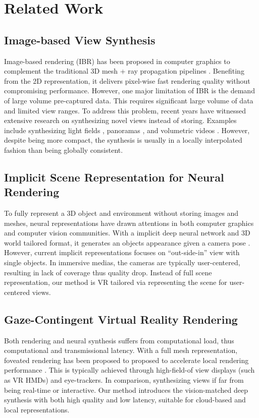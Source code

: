 \section{Related Work}
\label{sec:prior}

\subsection{Image-based View Synthesis}
Image-based rendering (IBR) has been proposed in computer graphics to complement the traditional 3D mesh + ray propagation pipelines \cite{levoy1996light,gortler1996lumigraph}. Benefiting from the 2D representation, it delivers pixel-wise fast rendering quality without compromising performance. However, one major limitation of IBR is the demand of large volume pre-captured data. This requires significant large volume of data and limited view ranges. 
To address this problem, recent years have witnessed extensive research on synthesizing novel views instead of storing. Examples include synthesizing light fields \cite{LearningViewSynthesis}, panoramas \cite{Lin:DeepPanorama,Benjamin:2020:RTV}, and volumetric videos \cite{Broxton:immersiveLF}. However, despite being more compact, the synthesis is usually in a locally interpolated fashion than being globally consistent.

\subsection{Implicit Scene Representation for Neural Rendering}
To fully represent a 3D object and environment without storing images and meshes, neural representations have drawn attentions in both computer graphics and computer vision communities. With a implicit deep neural network and 3D world tailored format, it generates an objects appearance given a camera pose \cite{sitzmann2019deepvoxels,sitzmann2019srns,sitzmann2019siren,mildenhall2020nerf}. 
However, current implicit representations focuses on ``out-side-in'' view with single objects. In immersive medias, the cameras are typically user-centered, resulting in lack of coverage thus quality drop. Instead of full scene representation, our method is VR tailored via representing the scene for user-centered views.

\subsection{Gaze-Contingent Virtual Reality Rendering}
Both rendering and neural synthesis suffers from computational load, thus computational and transmissional latency.
With a full mesh representation, foveated rendering has been proposed to proposed to accelerate local rendering performance \cite{Guenter:2012:F3G,Patney:2016:TFR,Sun:2017:PGF,Kaplanyan:2019:DNR}. This is typically achieved through high-field-of view displays (such as VR HMDs) and eye-trackers. 
In comparison, synthesizing views if far from being real-time or interactive. Our method introduces the vision-matched deep synthesis with both high quality and low latency, suitable for cloud-based and local representations.

